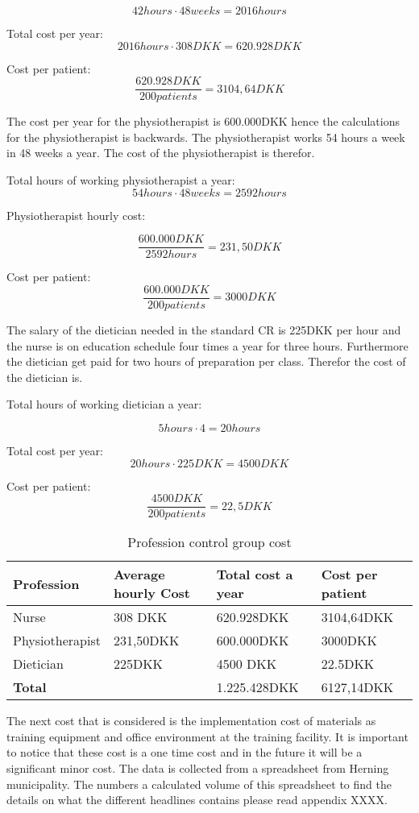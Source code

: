 $$42hours\cdot48weeks=2016hours$$

Total cost per year:
$$2016hours\cdot308DKK=620.928DKK$$

Cost per patient:
$$\frac{620.928DKK}{200patients}=3104,64DKK$$

The cost per year for the physiotherapist is 600.000DKK hence the calculations for the physiotherapist is backwards. The physiotherapist works 54 hours a week in 48 weeks a year. The cost of the physiotherapist is therefor.

Total hours of working physiotherapist a year:
$$54hours\cdot48weeks=2592hours$$

Physiotherapist hourly cost:

$$\frac{600.000DKK}{2592hours}=231,50DKK$$

Cost per patient:
$$\frac{600.000DKK}{200patients}=3000DKK$$

The salary of the dietician needed in the standard CR is 225DKK per hour and the nurse is on education schedule four times a year for three hours. Furthermore the dietician get paid for two hours of preparation per class.  Therefor the cost of the dietician is.

Total hours of working dietician a year:

$$5hours\cdot4=20hours$$

Total cost per year:
$$20hours\cdot225DKK=4500DKK$$

Cost per patient:
$$\frac{4500DKK}{200patients}=22,5DKK$$

\begin{table}[H]
\begin{longtabu} to 
    \textbf{Profession} & \textbf{Average hourly Cost} & \textbf{Total cost a year} & \textbf{Cost per patient} \\[-1ex]
    \midrule
     Nurse   &    308 DKK & 620.928DKK & 3104,64DKK \\ \hline
    Physiotherapist   &   231,50DKK  & 600.000DKK & 3000DKK \\ \hline
    Dietician   &  225DKK &    4500 DKK    & 22.5DKK \\ 
    \hline \hline \hline
    \textbf{Total} & & 1.225.428DKK & 6127,14DKK
    \newline
   \end{longtabu}
\caption{Profession control group cost}
\label{tab: PC}
\end{table}

The next cost that is considered is the implementation cost of materials as training equipment and office environment at the training facility. It is important to notice that these cost is a one time cost and in the future it will be a significant minor cost. The data is collected from a spreadsheet from Herning municipality. The numbers a calculated volume of this spreadsheet to find the details on what the different headlines contains please read appendix XXXX. 


